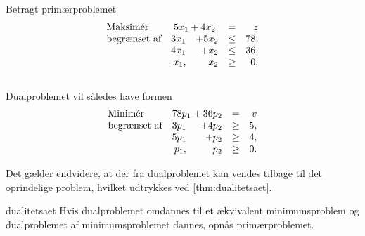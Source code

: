 %
\begin{eks}
\label{dual}
%
Betragt primærproblemet
%
\begin{align*}
\begin{array}{lrrlr}
\text{Maksimér}		&	\multicolumn{2}{c}{5x_1+4x_2}  & = & z\\
\text{begrænset af}	&3x_1& +5x_2			&\leq 	&78,\\
					&4x_1& + x_2				&\leq	& 36,\\
					&x_1,&  x_2				&\geq	& 0.
\end{array}
\end{align*}
\\
Dualproblemet vil således have formen
\begin{align*}
\begin{array}{lrrlr}
\text{Minimér}		&	\multicolumn{2}{c}{78p_1+36p_2}  & =  & v\\
\text{begrænset af}	&3p_1& +4p_2			&\geq 	&5,\\
					&5p_1& + p_2				&\geq	& 4,\\
					&p_1,&  p_2				&\geq	& 0.
\end{array}
\end{align*}
% 
%
\end{eks}
%
%
Det gælder endvidere, at der fra dualproblemet kan vendes tilbage til det oprindelige problem, hvilket udtrykkes ved \ref{thm:dualitetsaet}.
%
\begin{thm}{}{dualitetsaet}
Hvis dualproblemet omdannes til et ækvivalent minimumsproblem og dualproblemet af minimumsproblemet dannes, opnås primærproblemet.
\end{thm}
%
\newpage
%
